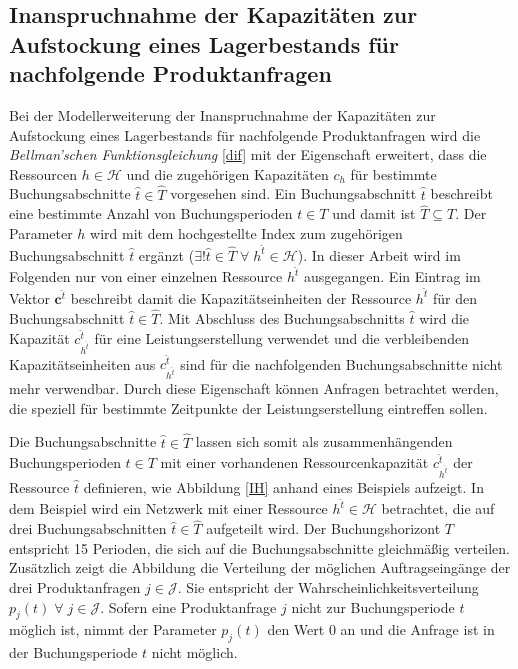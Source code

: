 \subsection{Inanspruchnahme der Kapazitäten zur Aufstockung eines Lagerbestands für nachfolgende Produktanfragen}

Bei der Modellerweiterung der Inanspruchnahme der Kapazitäten zur Aufstockung eines Lagerbestands für nachfolgende Produktanfragen wird die \textit{Bellman'schen Funktionsgleichung} \ref{dif} mit der Eigenschaft erweitert, dass die Ressourcen $h\in\mathcal{H}$ und die zugehörigen Kapazitäten $c_{h}$ für bestimmte Buchungsabschnitte $\hat{t}\in \hat{T}$ vorgesehen sind. Ein Buchungsabschnitt $\hat{t}$ beschreibt eine bestimmte Anzahl von Buchungsperioden $t\in T$ und damit ist $\hat{T}\subseteq T$. Der Parameter $h$ wird mit dem hochgestellte Index zum zugehörigen Buchungsabschnitt $\hat{t}$ ergänzt ($\exists{!\hat{t}}\in\hat{T}\; \forall\; h^{\hat{t}}\in\mathcal{H}$). In dieser Arbeit wird im Folgenden nur von einer einzelnen Ressource $h^{\hat{t}}$ ausgegangen. Ein Eintrag im Vektor $\textbf{c}^{\hat{t}}$ beschreibt damit die Kapazitätseinheiten der Ressource $h^{\hat{t}}$ für den Buchungsabschnitt $\hat{t}\in\hat{T}$. Mit Abschluss des Buchungsabschnitts $\hat{t}$ wird die Kapazität $c^{\hat{t}}_{h^{\hat{t}}}$ für eine Leistungserstellung verwendet und die verbleibenden Kapazitätseinheiten aus $c^{\hat{t}}_{h^{\hat{t}}}$ sind für die nachfolgenden Buchungsabschnitte nicht mehr verwendbar. Durch diese Eigenschaft können Anfragen betrachtet werden, die speziell für bestimmte Zeitpunkte der Leistungserstellung eintreffen sollen. 

Die Buchungsabschnitte $\hat{t}\in \hat{T}$ lassen sich somit als zusammenhängenden Buchungsperioden $t\in T$ mit einer vorhandenen Ressourcenkapazität $c^{\hat{t}}_{h^{\hat{t}}}$ der Ressource $\hat{t}$ definieren, wie Abbildung \ref{IH} anhand eines Beispiels aufzeigt. In dem Beispiel wird ein Netzwerk mit einer Ressource $h^{\hat{t}}\in\mathcal{H}$ betrachtet, die auf drei Buchungsabschnitten $\hat{t}\in\hat{T}$ aufgeteilt wird. Der Buchungshorizont $T$ entspricht 15 Perioden, die sich auf die Buchungsabschnitte gleichmäßig verteilen. Zusätzlich zeigt die Abbildung die Verteilung der möglichen Auftragseingänge der drei Produktanfragen $j\in\mathcal{J}$. Sie entspricht der Wahrscheinlichkeitsverteilung $p_j(t)\; \forall\; j\in\mathcal{J}$. Sofern eine Produktanfrage $j$ nicht zur Buchungsperiode $t$ möglich ist, nimmt der Parameter $p_j(t)$ den Wert $0$ an und die Anfrage ist in der Buchungsperiode $t$ nicht möglich. 

